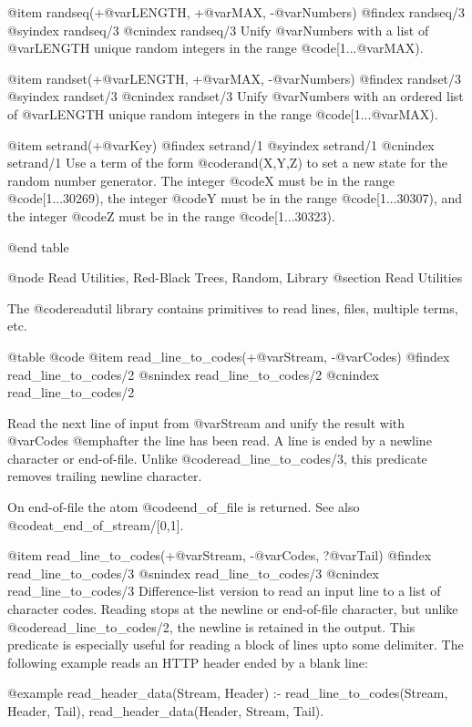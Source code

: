 @item randseq(+@var{LENGTH}, +@var{MAX}, -@var{Numbers})
@findex randseq/3
@syindex randseq/3
@cnindex randseq/3
Unify @var{Numbers} with a list of @var{LENGTH} unique random integers
in the range @code{[1...@var{MAX})}.

@item randset(+@var{LENGTH}, +@var{MAX}, -@var{Numbers})
@findex randset/3
@syindex randset/3
@cnindex randset/3
Unify @var{Numbers} with an ordered list of @var{LENGTH} unique random
integers in the range @code{[1...@var{MAX})}.

@item setrand(+@var{Key})
@findex setrand/1
@syindex setrand/1
@cnindex setrand/1
Use a term of the form @code{rand(X,Y,Z)} to set a new state for the
random number generator. The integer @code{X} must be in the range
@code{[1...30269)}, the integer @code{Y} must be in the range
@code{[1...30307)}, and the integer @code{Z} must be in the range
@code{[1...30323)}.

@end table

@node Read Utilities, Red-Black Trees, Random, Library
@section Read Utilities

The @code{readutil} library contains primitives to read lines, files,
multiple terms, etc.

@table @code
@item read_line_to_codes(+@var{Stream}, -@var{Codes})
@findex read_line_to_codes/2
@snindex read_line_to_codes/2
@cnindex read_line_to_codes/2

Read the next line of input from @var{Stream} and unify the result with
@var{Codes} @emph{after} the line has been read.  A line is ended by a
newline character or end-of-file. Unlike @code{read_line_to_codes/3},
this predicate removes trailing newline character.

On end-of-file the atom @code{end_of_file} is returned.  See also
@code{at_end_of_stream/[0,1]}.

@item read_line_to_codes(+@var{Stream}, -@var{Codes}, ?@var{Tail})
@findex read_line_to_codes/3
@snindex read_line_to_codes/3
@cnindex read_line_to_codes/3
Difference-list version to read an input line to a list of character
codes.  Reading stops at the newline or end-of-file character, but
unlike @code{read_line_to_codes/2}, the newline is retained in the
output.  This predicate is especially useful for reading a block of
lines upto some delimiter.  The following example reads an HTTP header
ended by a blank line:

@example
read_header_data(Stream, Header) :-
    read_line_to_codes(Stream, Header, Tail),
    read_header_data(Header, Stream, Tail).

